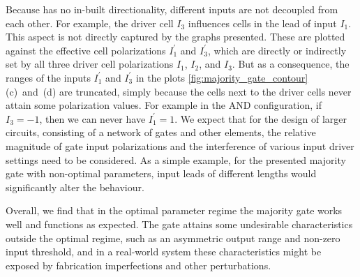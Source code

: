 Because  has no in-built directionality, different inputs are not
decoupled from each other. For example, the driver cell $I_3$ influences cells
in the lead of input $I_1$. This aspect is not directly captured by the graphs
presented. These are plotted against the effective cell polarizations
$I_1^{\prime}$ and $I_3^{\prime}$, which are directly or indirectly set by all
three driver cell polarizations $I_1$, $I_2$, and $I_3$. But as a consequence,
the ranges of the inputs $I_1^{\prime}$ and $I_3^{\prime}$ in the plots
\ref{fig:majority_gate_contour}(c)~and~(d) are truncated, simply because the
cells next to the driver cells never attain some polarization values. For
example in the AND configuration, if $I_3 = -1$, then we can never have
$I_1^{\prime} = 1$. We expect that for the design of larger circuits, consisting
of a network of gates and other elements, the relative magnitude of gate input
polarizations and the interference of various input driver settings need to be
considered. As a simple example, for the presented majority gate with
non-optimal parameters, input leads of different lengths would significantly
alter the behaviour.

Overall, we find that in the optimal parameter regime the majority gate works
well and functions as expected. The gate attains some undesirable
characteristics outside the optimal regime, such as an asymmetric output range
and non-zero input threshold, and in a real-world system these characteristics
might be exposed by fabrication imperfections and other perturbations.
